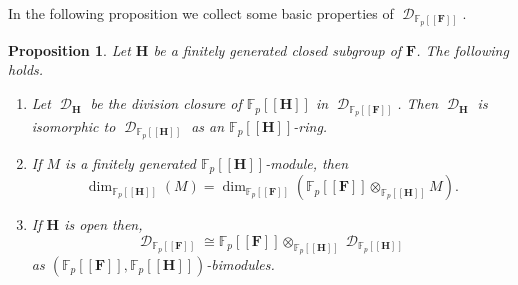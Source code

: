 \documentclass[11pt]{amsart}
\newtheorem{pro}[lem]{Proposition}
\numberwithin{claimcounter}{lem}
\DeclareMathOperator{\D}{\mathcal D}
\newcommand{\F}{\mathbb{F}}
\begin{document}
  In the following proposition we collect some basic properties of $\D_{\F_p[[\mathbf F]]}$.
 \begin{pro}\label{passH}
Let $\mathbf H$ be a finitely generated closed  subgroup of $\mathbf F$. The following holds.
\begin{enumerate}
 \item [(a)] Let $\D_\mathbf H$ be the division closure of $\F_p[[\mathbf H]]$ in $\D_{\F_p[[\mathbf F]]}$. Then $\D_\mathbf H$   is isomorphic to $\D_{\F_p[[\mathbf H]]}$  as an $\F_p[[\mathbf H]]$-ring. 
 \item [(b)] If  $M$ is a finitely generated $\F_p[[\mathbf H]]$-module, then
  $$\dim_{\F_p[[\mathbf H]]}(M)=\dim_{\F_p[[\mathbf F]]}(\F_p[[\mathbf F]]\otimes_{\F_p[[\mathbf H]]} M).$$
 \item[(c)]   If $\mathbf H$ is open then,  $$\D_{\F_p[[\mathbf F]]}\cong \F_p[[\mathbf F]]\otimes_{\F_p[[\mathbf H]]} \D_{\F_p[[\mathbf H]]}$$ as $(\F_p[[\mathbf F]],\F_p[[\mathbf H]])$-bimodules.
 \end{enumerate}
 \end{pro}
\end{document}
